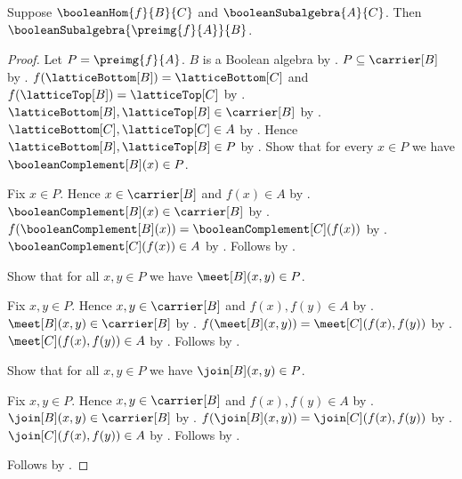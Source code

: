 \begin{theorem}\label{boolean_hom_subalgebra_preimage}
    Suppose $\booleanHom{f}{B}{C}$ and
        $\booleanSubalgebra{A}{C}$.
    Then $\booleanSubalgebra{\preimg{f}{A}}{B}$.
\end{theorem}
\begin{proof}
    Let $P=\preimg{f}{A}$.
    $B$ is a Boolean algebra by
        .
    $P\subseteq\carrier[B]$ by
        .
    $f(\latticeBottom[B])=\latticeBottom[C]$ and
        $f(\latticeTop[B])=\latticeTop[C]$ by
        .
    $\latticeBottom[B],\latticeTop[B]\in\carrier[B]$ by
        .
    $\latticeBottom[C],\latticeTop[C]\in A$ by
        .
    Hence $\latticeBottom[B],\latticeTop[B]\in P$ by
        .
    Show that for every $x\in P$ we have
        $\booleanComplement[B](x)\in P$.
    \begin{subproof}
        Fix $x\in P$.
        Hence $x\in\carrier[B]$ and $f(x)\in A$ by
            .
        $\booleanComplement[B](x)\in\carrier[B]$ by
            .
        $f(\booleanComplement[B](x))
            =\booleanComplement[C](f(x))$ by
            .
        $\booleanComplement[C](f(x))\in A$ by
            .
        Follows by .
    \end{subproof}
    Show that for all $x,y\in P$ we have $\meet[B](x,y)\in P$.
    \begin{subproof}
        Fix $x,y\in P$.
        Hence $x,y\in\carrier[B]$ and $f(x),f(y)\in A$ by
            .
        $\meet[B](x,y)\in\carrier[B]$ by
            .
        $f(\meet[B](x,y))=\meet[C](f(x),f(y))$ by
            .
        $\meet[C](f(x),f(y))\in A$ by
            .
        Follows by .
    \end{subproof}
    Show that for all $x,y\in P$ we have $\join[B](x,y)\in P$.
    \begin{subproof}
        Fix $x,y\in P$.
        Hence $x,y\in\carrier[B]$ and $f(x),f(y)\in A$ by
            .
        $\join[B](x,y)\in\carrier[B]$ by
            .
        $f(\join[B](x,y))=\join[C](f(x),f(y))$ by
            .
        $\join[C](f(x),f(y))\in A$ by
            .
        Follows by .
    \end{subproof}
    Follows by .
\end{proof}

